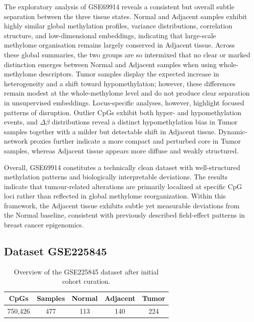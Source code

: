 The exploratory analysis of GSE69914 reveals a consistent but overall subtle separation between the three tissue states. Normal and Adjacent samples exhibit highly similar global methylation profiles, variance distributions, correlation structure, and low-dimensional embeddings, indicating that large-scale methylome organisation remains largely conserved in Adjacent tissue. Across these global summaries, the two groups are so intermixed that no clear or marked distinction emerges between Normal and Adjacent samples when using whole-methylome descriptors. Tumor samples display the expected increase in heterogeneity and a shift toward hypomethylation; however, these differences remain modest at the whole-methylome level and do not produce clear separation in unsupervised embeddings.
Locus-specific analyses, however, highlight focused patterns of disruption. Outlier CpGs exhibit both hyper- and hypomethylation events, and $\Delta\beta$ distributions reveal a distinct hypomethylation bias in Tumor samples together with a milder but detectable shift in Adjacent tissue. Dynamic-network proxies further indicate a more compact and perturbed core in Tumor samples, whereas Adjacent tissue appears more diffuse and weakly structured.

Overall, GSE69914 constitutes a technically clean dataset with well-structured methylation patterns and biologically interpretable deviations. The results indicate that tumour-related alterations are primarily localized at specific CpG loci rather than reflected in global methylome reorganization. Within this framework, the Adjacent tissue exhibits subtle yet measurable deviations from the Normal baseline, consistent with previously described field-effect patterns in breast cancer epigenomics.

\subsection{Dataset GSE225845}
\label{subsec:gse225845}

\begin{table}[t]
\centering
\caption{Overview of the GSE225845 dataset after initial cohort curation.}
\label{tab:gse225845_overview}
\scriptsize
\begin{tabular}{c c c c c}
\toprule
\textbf{CpGs} &
\textbf{Samples} &
\textbf{Normal} &
\textbf{Adjacent} &
\textbf{Tumor} \\
\midrule
750{,}426 &
477 &
113 &
140 &
224 \\
\bottomrule
\end{tabular}
\end{table}

